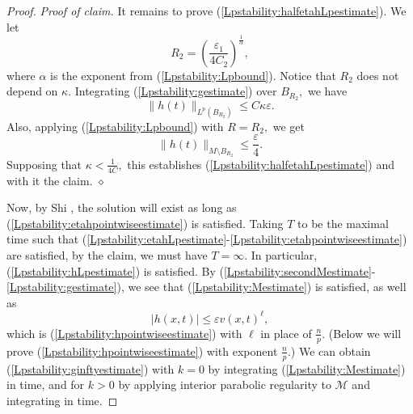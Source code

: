 \documentclass[12pt]{amsart}
\newcommand{\calM}{\mathcal{M}}
\renewcommand{\1}{{\mathbf 1}}
\newcommand{\eps}{{\varepsilon}}
\newenvironment{claimproof}{\par\noindent\textit{Proof of claim.}\space}{\hfill$\diamond$\medskip\par}
\theoremstyle{others}
\numberwithin{equation}{section}
\begin{document}
\begin{proof}
\begin{claimproof}
    It remains to prove (\ref{Lpstability:halfetahLpestimate}). We let
    $$R_2 = \left( \frac{\eps_1}{4C_2} \right)^{\frac{1}{\alpha}},$$
    where $\alpha$ is the exponent from (\ref{Lpstability:Lpbound}).
    Notice that $R_2$ does not depend on $\kappa.$ Integrating (\ref{Lpstability:gestimate}) over $B_{R_2},$ we have
    \begin{equation}
        \| h (t) \|_{L^p(B_{R_2})} \leq C \kappa \eps.
    \end{equation}
    Also, applying (\ref{Lpstability:Lpbound}) with $R = R_2,$ we get
    \begin{equation}
        \| h (t) \|_{M \setminus B_{R_2}} \leq \frac{\eps}{4}.
    \end{equation}
    Supposing that $\kappa < \frac{1}{4C},$ this establishes (\ref{Lpstability:halfetahLpestimate}) and with it the claim.
    \end{claimproof}

Now, by Shi \cite{Shi89}, the solution will exist as long as  (\ref{Lpstability:etahpointwiseestimate}) is satisfied. Taking $T$ to be the maximal time such that (\ref{Lpstability:etahLpestimate}-\ref{Lpstability:etahpointwiseestimate}) are satisfied, by the claim, we must have $T = \infty.$ In particular, (\ref{Lpstability:hLpestimate}) is satisfied. By (\ref{Lpstability:secondMestimate}-\ref{Lpstability:gestimate}), we see that (\ref{Lpstability:Mestimate}) is satisfied, as well as
          \begin{equation}\label{Lpstability:hpointwiseestimateellonly}
       | h(x,t) | \leq \eps v(x,t)^{\ell},
    \end{equation}
which is (\ref{Lpstability:hpointwiseestimate}) with $\ell$ in place of $\frac{n}{p}.$ (Below we will prove (\ref{Lpstability:hpointwiseestimate}) with exponent $\frac{n}{p}.$) We can obtain (\ref{Lpstability:ginftyestimate}) with $k = 0$ by integrating (\ref{Lpstability:Mestimate}) in time, and for $k > 0$ by applying interior parabolic regularity to $\calM$ and integrating in time.


\end{proof}
\end{document}
